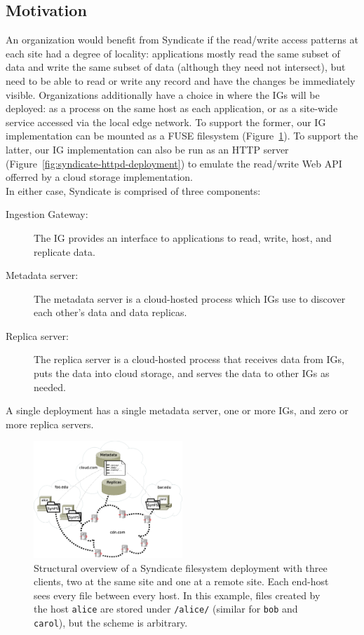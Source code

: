 \subsection{Motivation}

An organization would benefit from Syndicate if the read/write access patterns at each site had a degree of locality:  applications mostly read the same subset of data and write the same subset of data (although they need not intersect), but need to be able to read or write any record and have the changes be immediately visible.  Organizations additionally have a choice in where the IGs will be deployed:  as a process on the same host as each application, or as a site-wide service accessed via the local edge network.  To support the former, our IG implementation can be mounted as a FUSE filesystem (Figure~\ref{fig:syndicatefs-deployment}).  To support the latter, our IG implementation can also be run as an HTTP server (Figure~\ref{fig:syndicate-httpd-deployment}) to emulate the read/write Web API offerred by a cloud storage implementation.
\\
In either case, Syndicate is comprised of three components:

\begin{description}
\item[Ingestion Gateway:] The IG provides an interface to applications to read, write, host, and replicate data.
\item[Metadata server:] The metadata server is a cloud-hosted process which IGs use to discover each other's data and data replicas.
\item[Replica server:]  The replica server is a cloud-hosted process that receives data from IGs, puts the data into cloud storage, and serves the data to other IGs as needed.
\end{description}

A single deployment has a single metadata server, one or more IGs, and zero or more replica servers.

\begin{figure}[h!]
\centering
\includegraphics[width=0.5\textwidth]{figures/syndicatefs-deployment}
\caption{Structural overview of a Syndicate filesystem deployment with three clients, two at the same site and one at a remote site.  Each end-host sees every file between every host.  In this example, files created by the host \texttt{alice} are stored under \texttt{/alice/} (similar for \texttt{bob} and \texttt{carol}), but the scheme is arbitrary.}
\label{fig:syndicatefs-deployment}
\end{figure}

